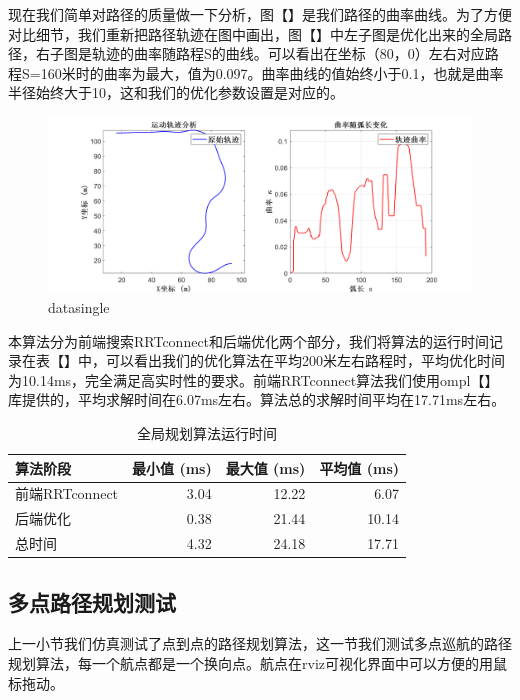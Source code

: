 \documentclass[master,academic]{ysuthesis} %
\begin{document}
		现在我们简单对路径的质量做一下分析，图【】是我们路径的曲率曲线。为了方便对比细节，我们重新把路径轨迹在图中画出，图【】中左子图是优化出来的全局路径，右子图是轨迹的曲率随路程S的曲线。可以看出在坐标（80，0）左右对应路程S=160米时的曲率为最大，值为0.097。曲率曲线的值始终小于0.1，也就是曲率半径始终大于10，这和我们的优化参数设置是对应的。
		\begin{figure}[!ht]
			\centering
			\includegraphics[width=1\textwidth]{datasingle.png}
			\caption{datasingle}
			\label{fig:datasingle}
		\end{figure}
		本算法分为前端搜索RRTconnect和后端优化两个部分，我们将算法的运行时间记录在表【】中，可以看出我们的优化算法在平均200米左右路程时，平均优化时间为10.14ms，完全满足高实时性的要求。前端RRTconnect算法我们使用ompl【】库提供的，平均求解时间在6.07ms左右。算法总的求解时间平均在17.71ms左右。
		\begin{table}[!ht]
			\caption{全局规划算法运行时间}
			\label{tab:global_planning_time}
			\centering
			\begin{tabular}{l rrr}
				\toprule
				算法阶段   & 最小值 (ms) & 最大值 (ms) & 平均值 (ms) \\
				\midrule
				前端RRTconnect & 3.04    & 12.22   & 6.07       \\
				后端优化       & 0.38    & 21.44    & 10.14      \\
				总时间         & 4.32    & 24.18    & 17.71      \\
				\bottomrule
			\end{tabular}
		\end{table}

		\subsection{多点路径规划测试}
		上一小节我们仿真测试了点到点的路径规划算法，这一节我们测试多点巡航的路径规划算法，每一个航点都是一个换向点。航点在rviz可视化界面中可以方便的用鼠标拖动。
\end{document}
